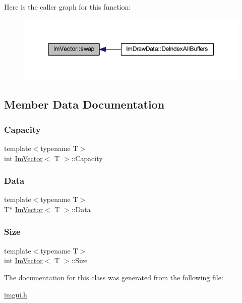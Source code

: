 Here is the caller graph for this function\+:
\nopagebreak
\begin{figure}[H]
\begin{center}
\leavevmode
\includegraphics[width=350pt]{class_im_vector_ac7f0862107eb88349d17f9a2e147deaa_icgraph}
\end{center}
\end{figure}


\subsection{Member Data Documentation}
\mbox{\label{class_im_vector_abd24482b4d30d22e37582e521e5bfb33}} 
\subsubsection{\texorpdfstring{Capacity}{Capacity}}
{\footnotesize\ttfamily template$<$typename T$>$ \\
int \mbox{\hyperlink{class_im_vector}{Im\+Vector}}$<$ T $>$\+::Capacity}

\mbox{\label{class_im_vector_ac0e46e8b30cb079d93c8f0aad7d7cbd0}} 
\subsubsection{\texorpdfstring{Data}{Data}}
{\footnotesize\ttfamily template$<$typename T$>$ \\
T$\ast$ \mbox{\hyperlink{class_im_vector}{Im\+Vector}}$<$ T $>$\+::Data}

\mbox{\label{class_im_vector_abbfd157947f66280d27b21d70a16df8d}} 
\subsubsection{\texorpdfstring{Size}{Size}}
{\footnotesize\ttfamily template$<$typename T$>$ \\
int \mbox{\hyperlink{class_im_vector}{Im\+Vector}}$<$ T $>$\+::Size}



The documentation for this class was generated from the following file\+:\begin{DoxyCompactItemize}
\item 
\mbox{\hyperlink{imgui_8h}{imgui.\+h}}\end{DoxyCompactItemize}
